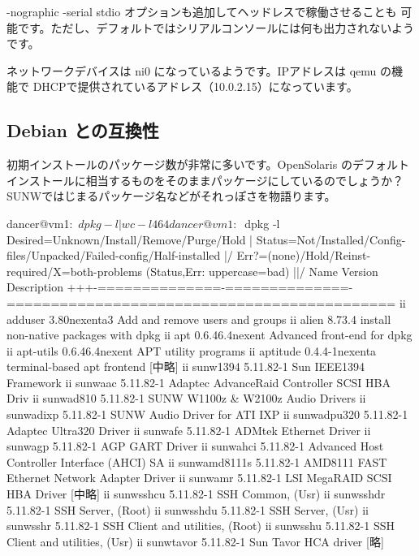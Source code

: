 \documentclass[mingoth,a4paper]{jsarticle}
\begin{document}
-nographic -serial stdio オプションも追加してヘッドレスで稼働させることも
可能です。ただし、デフォルトではシリアルコンソールには何も出力されないようです。

ネットワークデバイスは ni0 になっているようです。IPアドレスは qemu の機
能で DHCPで提供されているアドレス（10.0.2.15）になっています。


\subsection{Debian との互換性}

初期インストールのパッケージ数が非常に多いです。OpenSolaris のデフォルト
インストールに相当するものをそのままパッケージにしているのでしょうか？
SUNWではじまるパッケージ名などがそれっぽさを物語ります。

\begin{commandline}
dancer@vm1:~$ dpkg -l | wc -l 
464
dancer@vm1:~$ dpkg -l 
Desired=Unknown/Install/Remove/Purge/Hold
| Status=Not/Installed/Config-files/Unpacked/Failed-config/Half-installed
|/ Err?=(none)/Hold/Reinst-required/X=both-problems (Status,Err: uppercase=bad)
||/ Name           Version        Description
+++-==============-==============-============================================
ii  adduser        3.80nexenta3   Add and remove users and groups
ii  alien          8.73.4         install non-native packages with dpkg
ii  apt            0.6.46.4nexent Advanced front-end for dpkg
ii  apt-utils      0.6.46.4nexent APT utility programs
ii  aptitude       0.4.4-1nexenta terminal-based apt frontend
[中略]
ii  sunw1394       5.11.82-1      Sun IEEE1394 Framework
ii  sunwaac        5.11.82-1      Adaptec AdvanceRaid Controller SCSI HBA Driv
ii  sunwad810      5.11.82-1      SUNW W1100z & W2100z Audio Drivers
ii  sunwadixp      5.11.82-1      SUNW Audio Driver for ATI IXP
ii  sunwadpu320    5.11.82-1      Adaptec Ultra320 Driver
ii  sunwafe        5.11.82-1      ADMtek Ethernet Driver
ii  sunwagp        5.11.82-1      AGP GART Driver
ii  sunwahci       5.11.82-1      Advanced Host Controller Interface (AHCI) SA
ii  sunwamd8111s   5.11.82-1      AMD8111 FAST Ethernet Network Adapter Driver
ii  sunwamr        5.11.82-1      LSI MegaRAID SCSI HBA Driver
[中略]
ii  sunwsshcu      5.11.82-1      SSH Common, (Usr)
ii  sunwsshdr      5.11.82-1      SSH Server, (Root)
ii  sunwsshdu      5.11.82-1      SSH Server, (Usr)
ii  sunwsshr       5.11.82-1      SSH Client and utilities, (Root)
ii  sunwsshu       5.11.82-1      SSH Client and utilities, (Usr)
ii  sunwtavor      5.11.82-1      Sun Tavor HCA driver
[略]
\end{commandline}
\end{document}
